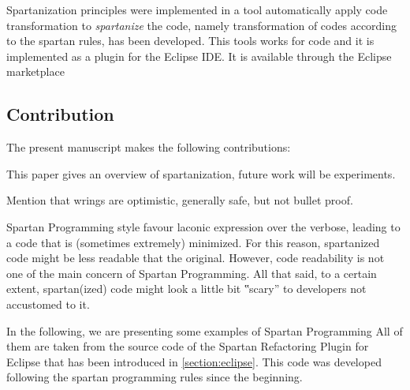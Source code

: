Spartanization principles were implemented in a tool automatically apply code
transformation to \emph{spartanize} the code, namely transformation of codes
according to the spartan rules, has been developed.
This tools works for \Java code and it is implemented as a plugin for the
Eclipse IDE\@. It is available through the Eclipse
marketplace



\subsection{Contribution}

The present manuscript makes the following contributions:


This paper gives an overview of spartanization, future work will be
experiments.

Mention that wrings are optimistic, generally safe, but not bullet proof.

Spartan Programming style favour laconic expression over the verbose, leading
to a code that is (sometimes extremely) minimized. For this reason, spartanized
code might be less readable that the original. However, code readability is not
one of the main concern of Spartan Programming. All that said, to a certain
extent, spartan(ized) code might look a little bit ‟scary” to developers not
accustomed to it.

In the following, we are presenting some examples of Spartan
Programming %
All of them are taken from the source code of the Spartan Refactoring Plugin
for Eclipse that has been introduced in \cref{section:eclipse}. This code was
developed following the spartan programming rules since the beginning.
